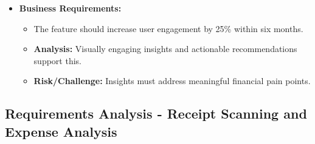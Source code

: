 \begin{itemize}
    \item \textbf{Business Requirements:}
    \begin{itemize}
        \item The feature should increase user engagement by 25\% within six months.
        \item \textbf{Analysis:} Visually engaging insights and actionable recommendations support this.
        \item \textbf{Risk/Challenge:} Insights must address meaningful financial pain points.
    \end{itemize}
\end{itemize}

\subsection{Requirements Analysis - Receipt Scanning and Expense Analysis}
